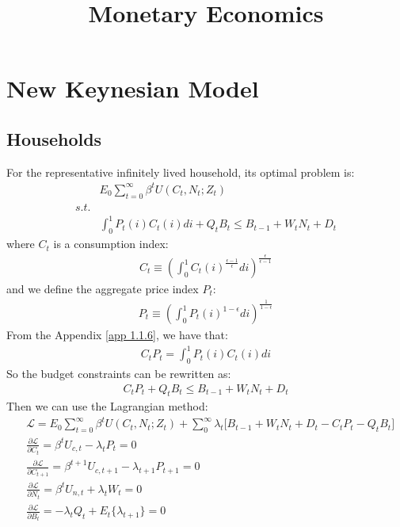 \documentclass{article}
\title{Monetary Economics}
\numberwithin{equation}{section}
\begin{document}
\onehalfspacing
\maketitle
\tableofcontents


\newpage
\section{New Keynesian Model}
\subsection{Households}
For the representative infinitely lived household, its optimal problem is:
	\begin{align*}
		&E_0 \sum\limits^\infty_{t=0} \beta^t U(C_t, N_t; Z_t)\\
		s.t.&\\
		&\int^1_0 P_t(i)C_t(i)di + Q_tB_t \leq B_{t-1} + W_tN_t + D_t
	\end{align*}
where $C_t$ is a consumption index:
	\begin{align*}
		C_t \equiv (\int^1_0 C_t(i)^{\frac{\epsilon-1}{\epsilon}}di)^{\frac{\epsilon}{\epsilon-1}}
	\end{align*}
and we define the aggregate price index $P_t$:
	\begin{align*}
		P_t \equiv (\int^1_0 P_t(i)^{1 - \epsilon} di)^{\frac{1}{1 - \epsilon}}
	\end{align*}
From the Appendix \eqref{app 1.1.6}, we have that:
	\begin{align*}
		C_t P_t = \int^1_0 P_t(i)C_t(i)di
	\end{align*}
So the budget constraints can be rewritten as:
	\begin{align*}
		C_t P_t + Q_tB_t \leq B_{t-1} + W_tN_t + D_t
	\end{align*}
Then we can use the Lagrangian method:
	\begin{align*}
		&\mathscr{L} = E_0 \sum\limits^\infty_{t=0} \beta^t U(C_t, N_t; Z_t) + \sum\limits^\infty_0 \lambda_t\bigg[B_{t-1} + W_tN_t + D_t - C_t P_t - Q_tB_t \bigg]\\
		&\frac{\partial \mathscr{L}}{\partial C_t} = \beta^t U_{c,t} - \lambda_t P_t = 0\\
		&\frac{\partial \mathscr{L}}{\partial C_{t+1}} = \beta^{t+1} U_{c,t+1} - \lambda_{t+1} P_{t+1} = 0\\
		&\frac{\partial \mathscr{L}}{\partial N_t} = \beta^t U_{n,t} + \lambda_t W_t = 0\\
		&\frac{\partial \mathscr{L}}{\partial B_t} = -\lambda_t Q_t + E_t\{\lambda_{t+1}\} = 0
	\end{align*}
\end{document}
